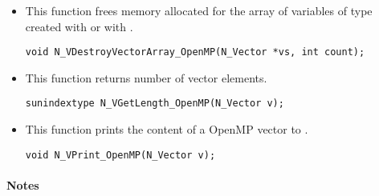 \begin{itemize}

\item {}

 This function frees memory allocated for the array of  variables of type
  created with  or with
 .

 

 \verb|void N_VDestroyVectorArray_OpenMP(N_Vector *vs, int count);|


\item {}

 This function returns number of vector elements.

 
 
 \verb|sunindextype N_VGetLength_OpenMP(N_Vector v);|


\item {}

 This function prints the content of a OpenMP vector to .

 
 
 \verb|void N_VPrint_OpenMP(N_Vector v);|

\end{itemize}
\paragraph{\bf Notes}                                                      
           
